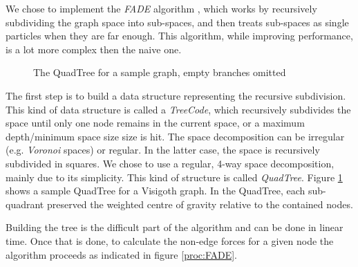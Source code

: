 \documentclass[a4paper,11pt,titlepage]{article}
\begin{document}
We chose to implement the \emph{FADE} algorithm \cite{fade}, which works by
recursively subdividing the graph space into sub-spaces, and then
treats sub-spaces as single particles when they are far enough. This
algorithm, while improving performance, is a lot more complex then the
naive one.

\begin{figure}
  \centering
  \hspace{10pt}
  \caption{The QuadTree for a sample graph, empty branches omitted}
  \label{fig:quadtree}
\end{figure}

The first step is to build a data structure representing the recursive
subdivision. This kind of data structure is called a \emph{TreeCode},
which recursively subdivides the space until only one node remains in
the current space, or a maximum depth/minimum space size size is
hit. The space decomposition can be irregular (e.g. \emph{Voronoi}
spaces) or regular. In the latter case, the space is recursively
subdivided in squares. We chose to use a regular, 4-way space
decomposition, mainly due to its simplicity. This kind of structure is
called \emph{QuadTree}. Figure \ref{fig:quadtree} shows a sample
QuadTree for a Visigoth graph. In the QuadTree, each sub-quadrant
preserved the weighted centre of gravity relative to the contained
nodes.

Building the tree is the difficult part of the algorithm and can be
done in linear time. Once that is done, to calculate the non-edge
forces for a given node the algorithm proceeds as indicated in figure
\ref{proc:FADE}.
\end{document}

